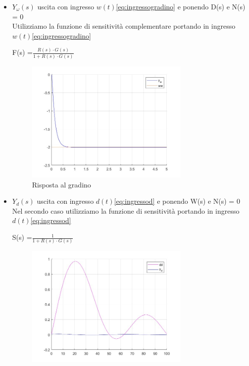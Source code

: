 \documentclass[a4paper, 11pt]{article}
\begin{document}
\begin{itemize}
\item $Y_\omega(s)$ uscita con ingresso $w(t)$\eqref{eq:ingressogradino} e ponendo D(s) e N(s) = 0\\
Utilizziamo la funzione di sensitività complementare portando in ingresso $w(t)$\eqref{eq:ingressogradino}\\
\begin{center}
F(s) =$  \frac{R(s) \cdot G(s)}{1+ R(s) \cdot G(s)} $
\end{center}

 \begin{figure}[H]
    \centering
    \includegraphics[width=0.75\textwidth]{immagini/risposta_al_gradino_punto_4.jpg}
    \caption{Risposta al gradino}
\end{figure}
 \item $Y_d (s)$ uscita con ingresso $d(t)$\eqref{eq:ingressod} e ponendo W(s) e N(s) = 0\\
Nel secondo caso utilizziamo la funzione di sensitività portando in ingresso $d(t)$\eqref{eq:ingressod}\\
\begin{center}
S(s) =$  \frac{1}{1+ R(s) \cdot G(s)} $
\end{center}
\begin{figure}[H]
    \centering
    \includegraphics[width=0.75\textwidth]{immagini/disturbouscita.jpg}

\end{figure}
\end{itemize}
\end{document}
